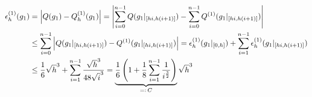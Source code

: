 \begin{align*}
    \epsilon_h^{(1)}(g_1)
    & = \left | 
            Q(g_1) - Q_h^{(1)}(g_1)
         \right |
    =   \left | 
            \sum_{i=0}^{n-1} Q(g_1|_{[hi, h(i+1)]}) -
            \sum_{i=0}^{n-1} Q^{(1)}(g_1|_{[hi, h(i+1)]})
         \right | \\
    & \leq
        \sum_{i=0}^{n-1} \left | 
            Q(g_1|_{[hi, h(i+1)]}) -
            Q^{(1)}(g_1|_{[hi, h(i+1)]})
         \right |
    =   \epsilon_h^{(1)}(g_1|_{[0, h]}) +
        \sum_{i=1}^{n-1} \epsilon_h^{(1)}(g_1|_{[hi, h(i+1)]}) \\
    & \leq
        \frac{1}{6} \sqrt{h}^3 +
        \sum_{i=1}^{n-1} \frac{\sqrt{h}^3}{48 \sqrt{i}^3}
    =   \underbrace
        {
            \frac{1}{6}
            \left ( 
                1 + \frac{1}{8} \sum_{i=1}^{n-1} \frac{1}{i^\frac{3}{2}}
             \right )
        }_{ =: \, C}
        \sqrt{h}^3
\end{align*}